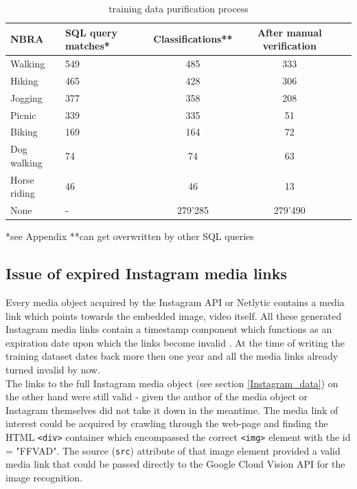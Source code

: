 \begin{table}[ht]
\begin{center}
\caption{training data purification process}\vspace{1ex}
\label{tab:trainingsdata}
\begin{tabular}{llccc}\hline
NBRA & SQL query matches* & Classifications** & After manual verification \\ \hline
Walking & 549 & 485 & 333 \\
Hiking & 465 & 428 & 306 \\
Jogging & 377 & 358 & 208 \\
Picnic & 339 & 335 & 51 \\
Biking & 169 & 164 & 72 \\
Dog walking & 74 & 74 & 63 \\
Horse riding & 46 & 46 & 13 \\
None & - & 279'285 & 279'490 \\ \hline
\end{tabular}
\newline
*see Appendix **can get overwritten by other SQL queries
\end{center}
\end{table}

\subsection{Issue of expired Instagram media links} \label{expired_media_links}
Every media object acquired by the Instagram API or Netlytic contains a media link which points towards the embedded image, video itself. All these generated Instagram media links contain a timestamp component which functions as an expiration date upon which the links become invalid \parencite{Wayne2018}. At the time of writing the training dataset dates back more then one year and all the media links already turned invalid by now. \\ %
The links to the full Instagram media object (see section \ref{Instagram_data}) on the other hand were still valid - given the author of the media object or Instagram themselves did not take it down in the meantime. The media link of interest could be acquired by crawling through the web-page and finding the HTML \texttt{<div>} container which encompassed the correct \texttt{<img>} element with the id = "FFVAD". The source (\texttt{src}) attribute of that image element provided a valid media link that could be passed directly to the Google Cloud Vision API for the image recognition.

